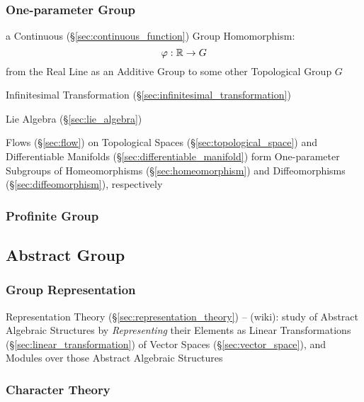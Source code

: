 \subsubsection{One-parameter Group}\label{sec:one_parameter_group}

a Continuous (\S\ref{sec:continuous_function}) Group Homomorphism:
\[
  \varphi : \mathbb{R} \rightarrow G
\]
from the Real Line as an Additive Group to some other Topological Group $G$

Infinitesimal Transformation (\S\ref{sec:infinitesimal_transformation})

Lie Algebra (\S\ref{sec:lie_algebra})

Flows (\S\ref{sec:flow}) on Topological Spaces (\S\ref{sec:topological_space})
and Differentiable Manifolds (\S\ref{sec:differentiable_manifold}) form
One-parameter Subgroups of Homeomorphisms (\S\ref{sec:homeomorphism}) and
Diffeomorphisms (\S\ref{sec:diffeomorphism}), respectively



\subsubsection{Profinite Group}\label{sec:profinite_group}



\subsection{Abstract Group}\label{sec:abstract_group}

\subsubsection{Group Representation}\label{sec:group_representation}

\fist Representation Theory (\S\ref{sec:representation_theory}) -- (wiki): study
of Abstract Algebraic Structures by \emph{Representing} their Elements as Linear
Transformations (\S\ref{sec:linear_transformation}) of Vector Spaces
(\S\ref{sec:vector_space}), and Modules over those Abstract Algebraic Structures



\subsubsection{Character Theory}\label{sec:character_theory}

